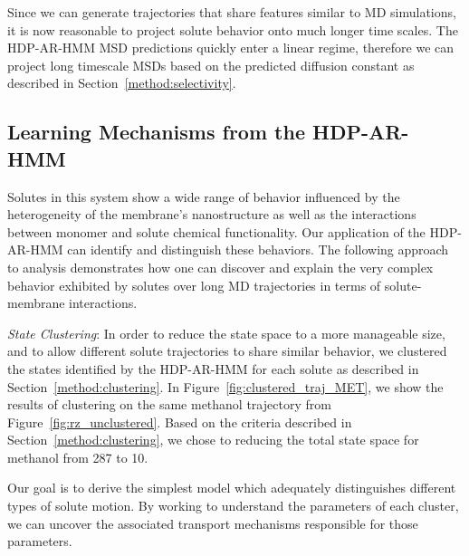 \documentclass[journal=jpcbfk,manuscript=article]{achemso}
\newcommand{\nclusters}{10}
\begin{document}

  Since we can generate trajectories that share features similar to MD simulations, 
  it is now reasonable to project solute behavior onto much longer time scales. The 
  HDP-AR-HMM MSD predictions quickly enter a linear regime, therefore we can project
  long timescale MSDs based on the predicted diffusion constant as described in 
  Section~\ref{method:selectivity}.
  
  
  
  \subsection{Learning Mechanisms from the HDP-AR-HMM}\label{section:mechanisms}
  
  Solutes in this system show a wide range of behavior influenced by the 
  heterogeneity of the membrane's nanostructure as well as the interactions 
  between monomer and solute chemical functionality. Our application of the 
  HDP-AR-HMM can identify and distinguish these behaviors. The following approach 
  to analysis demonstrates how one can discover and explain the very complex
  behavior exhibited by solutes over long MD trajectories in terms of 
  solute-membrane interactions.
  
  \textit{State Clustering}: In order to reduce the state space to a more 
  manageable size, and to allow different solute trajectories to share 
  similar behavior, we clustered the states identified by the HDP-AR-HMM for each
  solute as described in Section~\ref{method:clustering}. In 
  Figure~\ref{fig:clustered_traj_MET}, we show the results of clustering on the 
  same methanol trajectory from Figure~\ref{fig:rz_unclustered}. Based on 
  the criteria described in Section~\ref{method:clustering},
  we chose to reducing the total state space for methanol from 287 to \nclusters. 
  
  Our goal is to derive the simplest model which adequately distinguishes
  different types of solute motion. By working to understand the parameters of 
  each cluster, we can uncover the associated transport mechanisms responsible
  for those parameters.
  
\end{document}
